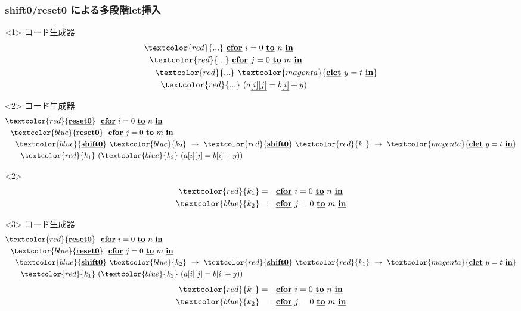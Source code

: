 \documentclass[dvipdfmx,cjk,xcolor=dvipsnames,envcountsect,notheorems,12pt]{beamer}
\newcommand\cResetz{\underline{\textbf{reset0}}}
\newcommand\cShiftz{\underline{\textbf{shift0}}}
\newcommand\cLet{\underline{\textbf{clet}}}
\newcommand\cIn{\underline{\textbf{in}}}
\newcommand\red[1]{\textcolor{red}{#1}}
\newcommand\magenta[1]{\textcolor{magenta}{#1}}
\newcommand\blue[1]{\textcolor{blue}{#1}}
\newcommand\cforin[2]{\underline{\textbf{cfor}}~{#1}~\underline{\textbf{to}}~{#2}~\underline{\textbf{in}}}
\newcommand\cArray[1]{\underline{[{#1}]}}
\newcommand\cArrays[2]{\underline{[{#1}][{#2}]}}
\theoremstyle{definition}
\begin{document}
\begin{frame}
  \frametitle{shift0/reset0 による多段階let挿入}
  \begin{onlyenv}<1>
    コード生成器
    \begin{align*}
      & \red{...}~ \cforin{i = 0}{n} \\
      & ~~\red{...}~ \cforin{j = 0}{m} \\
      & ~~~~\red{...}~ \magenta{\cLet~y=t~\cIn} \\
      & ~~~~~~\red{...}~ (a\cArrays{i}{j} = b\cArray{i} + y)
    \end{align*}
  \end{onlyenv}

  \begin{onlyenv}<2>
    コード生成器
    \begin{align*}
      & \red{\cResetz} ~~\cforin{i = 0}{n} \\
      & ~~\blue{\cResetz} ~~\cforin{j = 0}{m} \\
      & ~~~~\blue{\cShiftz}~\blue{k_2}~\to~ \red{\cShiftz}~\red{k_1}~\to~ \magenta{\cLet~y=t~\cIn} \\
      & ~~~~~~\red{k_1}~(\blue{k_2}~(a\cArrays{i}{j} = b\cArray{i} + y))
    \end{align*}
    \begin{invisibleenv}<2>
      \begin{align*}
        \red{k_1} &= ~~\cforin{i = 0}{n} \\
        \blue{k_2} &= ~~\cforin{j = 0}{m} \\
      \end{align*}
    \end{invisibleenv}
  \end{onlyenv}

  \begin{onlyenv}<3>
    コード生成器
    \begin{align*}
      & \red{\cResetz} ~~\cforin{i = 0}{n} \\
      & ~~\blue{\cResetz} ~~\cforin{j = 0}{m} \\
      & ~~~~\blue{\cShiftz}~\blue{k_2}~\to~ \red{\cShiftz}~\red{k_1}~\to~ \magenta{\cLet~y=t~\cIn} \\
      & ~~~~~~\red{k_1}~(\blue{k_2}~(a\cArrays{i}{j} = b\cArray{i} + y))
    \end{align*}
    \begin{align*}
      \red{k_1} &= ~~\cforin{i = 0}{n} \\
      \blue{k_2} &= ~~\cforin{j = 0}{m} \\
    \end{align*}
  \end{onlyenv}


\end{frame}
\end{document}
